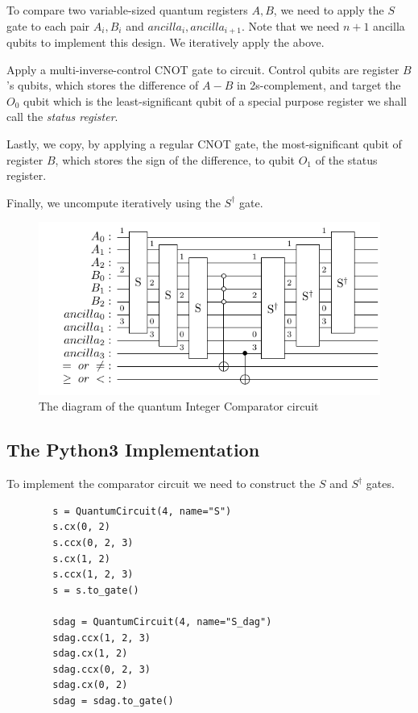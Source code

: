 To compare two variable-sized quantum registers $A, B$, we need to apply the $S$ gate to 
each pair $A_i,B_i$ and $ancilla_i,ancilla_{i+1}$. Note that we need $n+1$ ancilla qubits
to implement this design. We iteratively apply the above.

Apply a multi-inverse-control CNOT gate to circuit. Control qubits are register $B$'s qubits,
which stores the difference of $A-B$ in 2s-complement, and target the $O_0$ qubit which is the
least-significant qubit of a special purpose register we shall call the \textit{status register}.

Lastly, we copy, by applying a regular CNOT gate, the most-significant qubit of register $B$,
which stores the sign of the difference, to qubit $O_1$ of the status register.

Finally, we uncompute iteratively using the $S^\dag$ gate.

\begin{figure}[ht]
    \centering
    \includegraphics{images/5_Implementation/nko_comparator.pdf}
    \caption{The diagram of the quantum Integer Comparator circuit}
\end{figure}

\subsection{The Python3 Implementation}

To implement the comparator circuit we need to construct the $S$ and $S^\dag$ gates.

\begin{listing}[ht]
    \centering
    \begin{verbatim}
        s = QuantumCircuit(4, name="S")
        s.cx(0, 2)
        s.ccx(0, 2, 3)
        s.cx(1, 2)
        s.ccx(1, 2, 3)
        s = s.to_gate()

        sdag = QuantumCircuit(4, name="S_dag")
        sdag.ccx(1, 2, 3)
        sdag.cx(1, 2)
        sdag.ccx(0, 2, 3)
        sdag.cx(0, 2)
        sdag = sdag.to_gate()
    \end{verbatim}
    \caption{}
\end{listing}

